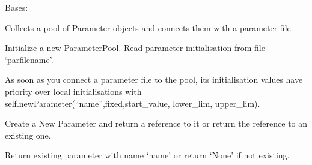 \documentclass[letterpaper,10pt,english]{sphinxmanual}
\begin{document}

\begin{fulllineitems}
\label{\detokenize{modules-api/parameters:Parameters.ParameterPool}}
Bases: 

Collects a pool of Parameter objects and connects them with a parameter file.

\begin{fulllineitems}
\label{\detokenize{modules-api/parameters:Parameters.ParameterPool.__init__}}
Initialize a new ParameterPool. Read parameter initialisation from file ‘parfilename’.

As soon as you connect a parameter file to the pool, its initialisation values have priority 
over local initialisations with self.newParameter(“name”,fixed,start\_value, lower\_lim, upper\_lim).

\end{fulllineitems}


\begin{fulllineitems}
\label{\detokenize{modules-api/parameters:Parameters.ParameterPool.newParameter}}
Create a New Parameter and return a reference to it or return the reference to an existing one.

\end{fulllineitems}


\begin{fulllineitems}
\label{\detokenize{modules-api/parameters:Parameters.ParameterPool.getParameter}}
Return existing parameter with name ‘name’ or return ‘None’ if not existing.

\end{fulllineitems}



\end{fulllineitems}
\end{document}
